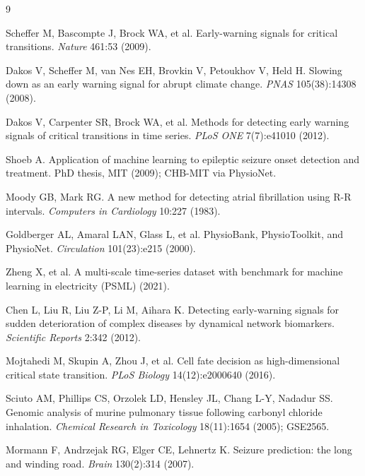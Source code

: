 \documentclass[11pt]{article}
\begin{document}
\begin{thebibliography}{9}

 Scheffer M, Bascompte J, Brock WA, et al.
Early-warning signals for critical transitions. \emph{Nature} 461:53
(2009).

 Dakos V, Scheffer M, van Nes EH, Brovkin V,
Petoukhov V, Held H. Slowing down as an early warning signal for abrupt
climate change. \emph{PNAS} 105(38):14308 (2008).

 Dakos V, Carpenter SR, Brock WA, et al. Methods for
detecting early warning signals of critical transitions in time series.
\emph{PLoS ONE} 7(7):e41010 (2012).

 Shoeb A. Application of machine learning to
epileptic seizure onset detection and treatment. PhD thesis, MIT
(2009); CHB-MIT via PhysioNet.

 Moody GB, Mark RG. A new method for detecting
atrial fibrillation using R-R intervals. \emph{Computers in Cardiology}
10:227 (1983).

 Goldberger AL, Amaral LAN, Glass L, et al.
PhysioBank, PhysioToolkit, and PhysioNet. \emph{Circulation}
101(23):e215 (2000).

 Zheng X, et al. A multi-scale time-series dataset
with benchmark for machine learning in electricity (PSML) (2021).

 Chen L, Liu R, Liu Z-P, Li M, Aihara K. Detecting
early-warning signals for sudden deterioration of complex diseases by
dynamical network biomarkers. \emph{Scientific Reports} 2:342 (2012).

 Mojtahedi M, Skupin A, Zhou J, et al. Cell fate
decision as high-dimensional critical state transition. \emph{PLoS
Biology} 14(12):e2000640 (2016).

 Sciuto AM, Phillips CS, Orzolek LD, Hensley JL,
Chang L-Y, Nadadur SS. Genomic analysis of murine pulmonary tissue
following carbonyl chloride inhalation. \emph{Chemical Research in
Toxicology} 18(11):1654 (2005); GSE2565.

 Mormann F, Andrzejak RG, Elger CE, Lehnertz K.
Seizure prediction: the long and winding road. \emph{Brain} 130(2):314
(2007).

\end{thebibliography}
\end{document}
